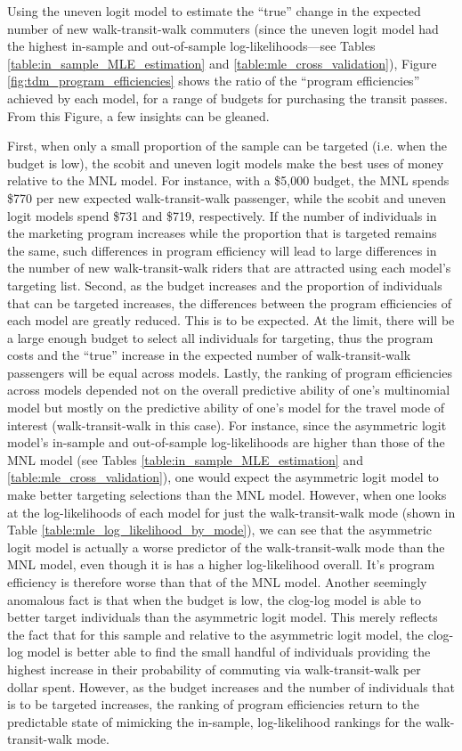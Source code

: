 Using the uneven logit model to estimate the ``true'' change in the expected number of new walk-transit-walk commuters (since the uneven logit model had the highest in-sample and out-of-sample log-likelihoods---see Tables \ref{table:in_sample_MLE_estimation} and \ref{table:mle_cross_validation}), Figure \ref{fig:tdm_program_efficiencies} shows the ratio of the ``program efficiencies'' achieved by each model, for a range of budgets for purchasing the transit passes. From this Figure, a few insights can be gleaned. 

First, when only a small proportion of the sample can be targeted (i.e. when the budget is low), the scobit and uneven logit models make the best uses of money relative to the MNL model. For instance, with a \$5,000 budget, the MNL spends \$770 per new expected walk-transit-walk passenger, while the scobit and uneven logit models spend \$731 and \$719, respectively. If the number of individuals in the marketing program increases while the proportion that is targeted remains the same, such differences in program efficiency will lead to large differences in the number of new walk-transit-walk riders that are attracted using each model's targeting list. Second, as the budget increases and the proportion of individuals that can be targeted increases, the differences between the program efficiencies of each model are greatly reduced. This is to be expected. At the limit, there will be a large enough budget to select all individuals for targeting, thus the program costs and the ``true'' increase in the expected number of walk-transit-walk passengers will be equal across models. Lastly, the ranking of program efficiencies across models depended not on the overall predictive ability of one's multinomial model but mostly on the predictive ability of one's model for the travel mode of interest (walk-transit-walk in this case). For instance, since the asymmetric logit model's in-sample and out-of-sample log-likelihoods are higher than those of the MNL model (see Tables \ref{table:in_sample_MLE_estimation} and \ref{table:mle_cross_validation}), one would expect the asymmetric logit model to make better targeting selections than the MNL model. However, when one looks at the log-likelihoods of each model for just the walk-transit-walk mode (shown in Table \ref{table:mle_log_likelihood_by_mode}), we can see that the asymmetric logit model is actually a worse predictor of the walk-transit-walk mode than the MNL model, even though it is has a higher log-likelihood overall. It's program efficiency is therefore worse than that of the MNL model. Another seemingly anomalous fact is that when the budget is low, the clog-log model is able to better target individuals than the asymmetric logit model. This merely reflects the fact that for this sample and relative to the asymmetric logit model, the clog-log model is better able to find the small handful of individuals providing the highest increase in their probability of commuting via walk-transit-walk per dollar spent. However, as the budget increases and the number of individuals that is to be targeted increases, the ranking of program efficiencies return to the predictable state of mimicking the in-sample, log-likelihood rankings for the walk-transit-walk mode.


